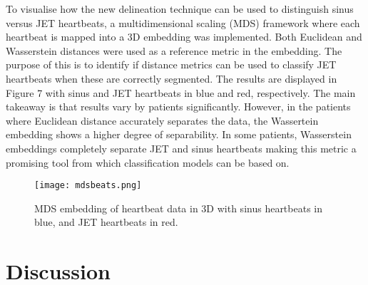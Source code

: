 \documentclass[conference,compsoc]{IEEEtran}
\begin{document}
To visualise how the new delineation technique can be used to distinguish sinus versus JET heartbeats, a multidimensional scaling (MDS) framework where each heartbeat is mapped into a 3D embedding was implemented. Both Euclidean and Wasserstein distances were used as a reference metric in the embedding. The purpose of this is to identify if distance metrics can be used to classify JET heartbeats when these are correctly segmented. The results are displayed in Figure 7 with sinus and JET heartbeats in blue and red, respectively. The main takeaway is that results vary by patients significantly. However, in the patients where Euclidean distance accurately separates the data, the Wassertein embedding shows a higher degree of separability. In some patients, Wasserstein embeddings completely separate JET and sinus heartbeats making this metric a promising tool from which classification models can be based on.

\begin{figure}[h]
\centering
\texttt{[image: mdsbeats.png]}
\caption{MDS embedding of heartbeat data in 3D with sinus heartbeats in blue, and JET heartbeats in red.}
\label{fig_sim}
\end{figure}



\section{Discussion}
\end{document}
